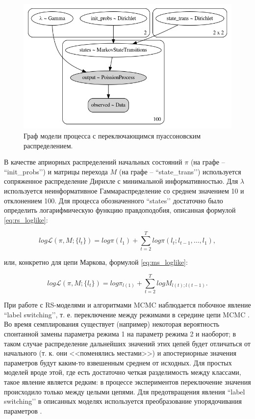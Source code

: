 \documentclass[a4paper,14pt]{extreport}
\begin{document}
\begin{figure}[H]
	\includegraphics[width=\linewidth]{img/gen/pp_ms_pois_graph.png}
	\caption{Граф модели процесса с переключающимся пуассоновским распределением. }
	\label{fig:pp_ms_pois_graph}
\end{figure}

В качестве априорных распределений начальных состояний $\pi$ (на графе -- ``init\_probs’’) и матрицы перехода $M$ (на графе -- ``state\_trans’’) используется сопряженное распределение Дирихле с минимальной информативностью. Для $\lambda$ используется неинформативное Гамма\-распределение со среднем значением 10 и отклонением 100. Для процесса обозначенного ``states’’ достаточно было определить логарифмическую функцию правдоподобия, описанная формулой \eqref{eq:rs_loglike}:

\begin{equation}
	\mathit{log}\mathcal{L}(\pi, M; \{l_t\})
	=
	\mathit{log}\pi(l_1) + 
	\sum\limits_{t=2}^{T}{ 
	\mathit{log}\pi(l_t; l_{t-1}, \dots, l_1)
	} ,
	\label{eq:rs_loglike}
\end{equation}

\noindent
или, конкретно для цепи Маркова, формулой \eqref{eq:ms_loglike}:

\begin{equation}
	\mathit{log}\mathcal{L}(\pi, M; \{l_t\})
	=
	\mathit{log} \pi_{l(1)} + 
	\sum\limits_{t=2}^{T}{ 
	\mathit{log} M_{l(t); l(t-1)}
	} .
	\label{eq:ms_loglike}
\end{equation}

При работе с RS-моделями и алгоритмами MCMC наблюдается побочное явление ``label switching’’, т. е. переключение между режимами в середине цепи MCMC \cite{stan_user_guide,blog_hidden_markov_ravinutala}. Во время семплирования существует (например) некоторая вероятность спонтанной замены параметра режима 1 на параметр режима 2 и наоборот; в таком случае распределение дальнейших значений этих цепей будет отличаться от начального (т. к. они <<поменялись местами>>) и апостериорные значения параметров будут каким-то взвешенным среднем от исходных. Для простых моделей вроде этой, где есть достаточно четкая разделимость между классами, такое явление является редким: в процессе экспериментов переключение значения происходило только между целыми цепями. Для предотвращения явления ``label switching’’ в описанных моделях используется преобразование упорядочивания параметров \cite{blog_hidden_markov_ravinutala}.
\end{document}
